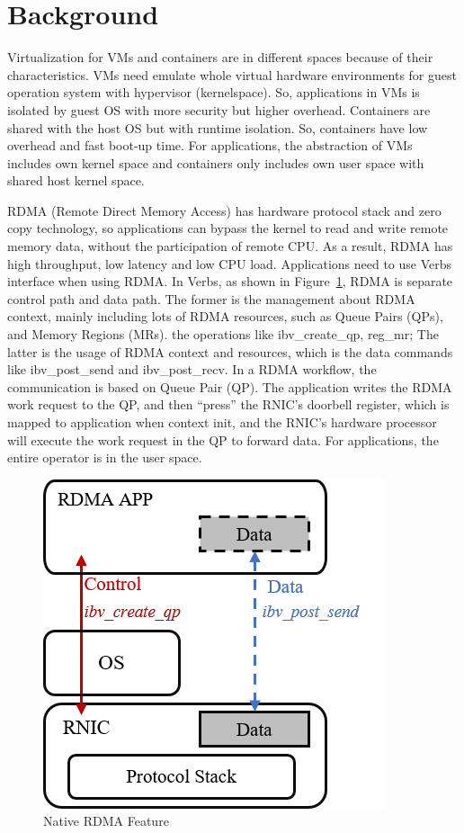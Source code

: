 \section{Background}

Virtualization for VMs and containers are in different spaces because of their characteristics. VMs need emulate whole virtual hardware environments for guest operation system with hypervisor (kernelspace). So, applications in VMs is isolated by guest OS with more security but higher overhead. Containers are shared with the host OS but with runtime isolation. So, containers have low overhead and fast boot-up time. For applications, the abstraction of VMs includes own kernel space and containers only includes own user space with shared host kernel space.

RDMA (Remote Direct Memory Access) has hardware protocol stack and zero copy technology, so applications can bypass the kernel to read and write remote memory data, without the participation of remote CPU. As a result, RDMA has high throughput, low latency and low CPU load. Applications need to use Verbs interface when using RDMA. In Verbs, as shown in Figure~\ref{fig:rdma-feat}, RDMA is separate control path and data path. The former is the management about RDMA context, mainly including lots of RDMA resources, such as Queue Pairs (QPs), and Memory Regions (MRs). the operations like ibv\_create\_qp, reg\_mr; The latter is the usage of RDMA context and resources, which is the data commands like ibv\_post\_send and ibv\_post\_recv. In a RDMA workflow, the communication is based on Queue Pair (QP). The application writes the RDMA work request to the QP, and then ``press''  the RNIC's doorbell register, which is mapped to application when context init, and the RNIC's hardware processor will execute the work request in the QP to forward data. For applications, the entire operator is in the user space.

\begin{figure}[!ht]
	\centering
	\includegraphics[width=0.6\linewidth]{images/rdma-feat}
	\caption{Native RDMA Feature}
	\label{fig:rdma-feat}
\end{figure}


